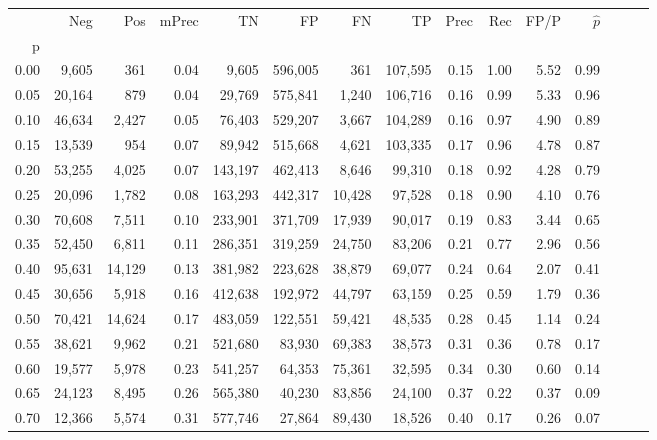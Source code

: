 \begin{tabular}{rrrrrrrrrrrrrrr}
\toprule
{} &     Neg &     Pos & mPrec &       TN &       FP &       FN &       TP &  Prec &   Rec &  FP/P & $\hat{p}$ \\
p    &         &         &       &          &          &          &          &       &       &       &           \\
\midrule
0.00 &   9,605 &     361 &  0.04 &    9,605 &  596,005 &      361 &  107,595 &  0.15 &  1.00 &  5.52 &      0.99 \\
0.05 &  20,164 &     879 &  0.04 &   29,769 &  575,841 &    1,240 &  106,716 &  0.16 &  0.99 &  5.33 &      0.96 \\
0.10 &  46,634 &   2,427 &  0.05 &   76,403 &  529,207 &    3,667 &  104,289 &  0.16 &  0.97 &  4.90 &      0.89 \\
0.15 &  13,539 &     954 &  0.07 &   89,942 &  515,668 &    4,621 &  103,335 &  0.17 &  0.96 &  4.78 &      0.87 \\
0.20 &  53,255 &   4,025 &  0.07 &  143,197 &  462,413 &    8,646 &   99,310 &  0.18 &  0.92 &  4.28 &      0.79 \\
0.25 &  20,096 &   1,782 &  0.08 &  163,293 &  442,317 &   10,428 &   97,528 &  0.18 &  0.90 &  4.10 &      0.76 \\
0.30 &  70,608 &   7,511 &  0.10 &  233,901 &  371,709 &   17,939 &   90,017 &  0.19 &  0.83 &  3.44 &      0.65 \\
0.35 &  52,450 &   6,811 &  0.11 &  286,351 &  319,259 &   24,750 &   83,206 &  0.21 &  0.77 &  2.96 &      0.56 \\
0.40 &  95,631 &  14,129 &  0.13 &  381,982 &  223,628 &   38,879 &   69,077 &  0.24 &  0.64 &  2.07 &      0.41 \\
0.45 &  30,656 &   5,918 &  0.16 &  412,638 &  192,972 &   44,797 &   63,159 &  0.25 &  0.59 &  1.79 &      0.36 \\
0.50 &  70,421 &  14,624 &  0.17 &  483,059 &  122,551 &   59,421 &   48,535 &  0.28 &  0.45 &  1.14 &      0.24 \\
0.55 &  38,621 &   9,962 &  0.21 &  521,680 &   83,930 &   69,383 &   38,573 &  0.31 &  0.36 &  0.78 &      0.17 \\
0.60 &  19,577 &   5,978 &  0.23 &  541,257 &   64,353 &   75,361 &   32,595 &  0.34 &  0.30 &  0.60 &      0.14 \\
0.65 &  24,123 &   8,495 &  0.26 &  565,380 &   40,230 &   83,856 &   24,100 &  0.37 &  0.22 &  0.37 &      0.09 \\
0.70 &  12,366 &   5,574 &  0.31 &  577,746 &   27,864 &   89,430 &   18,526 &  0.40 &  0.17 &  0.26 &      0.07 \\

\end{tabular}
